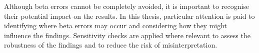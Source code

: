 Although beta errors cannot be completely avoided, it is important to recognise their potential impact on the results. 
In this thesis, particular attention is paid to identifying where beta errors may occur and considering how they might influence the findings. 
Sensitivity checks are applied where relevant to assess the robustness of the findings and to reduce the risk of misinterpretation. %


